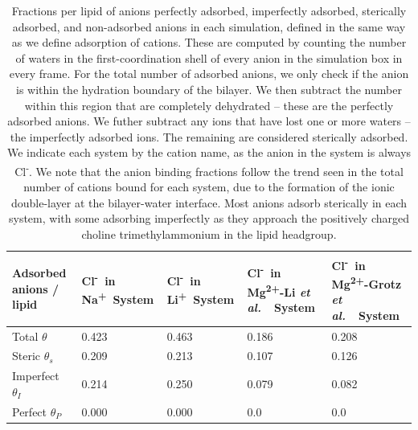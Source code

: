 \documentclass[journal=langd5,manuscript=article]{achemso}
\newcommand{\etal}{\textit{et al.}~}
\newcommand{\na}{Na\textsuperscript{+}~}
\newcommand{\cl}{Cl\textsuperscript{-}~}
\newcommand{\li}{Li\textsuperscript{+}~}
\newcommand{\mgmbnbfix}{Mg\textsuperscript{2+}-Li \etal~}
\newcommand{\mgmicro}{Mg\textsuperscript{2+}-Grotz \etal~}
\begin{document}
\begin{table}
    \caption{Fractions per lipid of anions perfectly adsorbed, imperfectly adsorbed, sterically adsorbed, and non-adsorbed anions in each simulation, defined in the same way as we define
    adsorption of cations. These are computed
    by counting the number of waters in the first-coordination shell of every anion in the simulation box in every frame. For the total number
    of adsorbed anions, we
    only check if the anion is within the hydration boundary of the bilayer. We then subtract the number within this region that are
    completely dehydrated -- these are the perfectly adsorbed anions. We futher subtract any ions that have lost 
    one or more waters -- the imperfectly adsorbed
    ions. The remaining are considered sterically adsorbed. We indicate each system by the cation name, as the anion in the system is always Cl\textsuperscript{-}.
    We note that the anion binding fractions follow the trend seen in the total number of cations bound for each system, due to the formation of the ionic double-layer 
    at the bilayer-water interface. 
    Most anions adsorb sterically in each system, with some adsorbing imperfectly as they approach the positively charged choline trimethylammonium in the lipid headgroup.}
    \label{tab:anionfrac}\tiny
    \begin{tabularx}{\textwidth}{|X|X|X|X|X|}\hline
    Adsorbed anions / lipid     & \cl in \na System & \cl in \li System & \cl in \mgmbnbfix System& \cl in \mgmicro System\\\hline
    Total      $\theta  $&0.423&0.463& 0.186&0.208 \\\hline
    Steric     $\theta_s$&0.209&0.213& 0.107&0.126 \\\hline
    Imperfect  $\theta_I$&0.214&0.250& 0.079&0.082 \\\hline
    Perfect    $\theta_P$&0.000&0.000&  0.0 & 0.0  \\\hline

    \end{tabularx}
\end{table}
\end{document}
